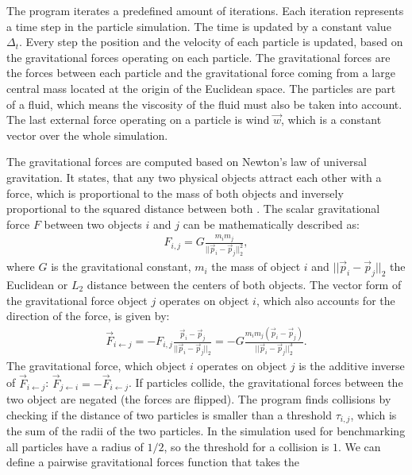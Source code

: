 \documentclass[twoside,11pt]{article}
\begin{document}
The program iterates a predefined amount of iterations.
Each iteration represents a time step in the particle simulation.
The time is updated by a constant value $\Delta_t$.
Every step the position and the velocity of each particle is
updated, based on the gravitational forces operating on each particle.
The gravitational forces are the forces between each particle and the
gravitational force coming from a large central mass located at the
origin of the Euclidean space.
The particles are part of a fluid, which means the viscosity of
the fluid must also be taken into account.
The last external force operating on a particle is wind $\vec{w}$,
which is a constant vector over the whole simulation.

The gravitational forces are computed based on Newton's law of
universal gravitation.
It states, that any two physical objects attract each other
with a force, which is proportional to the mass of both objects and
inversely proportional to the squared distance between both
\citep{feynman1963}.
The scalar gravitational force $F$ between two objects $i$ and $j$ can
be mathematically described as:
\begin{align}
  F_{i,j} = G\frac{m_i m_j}{||\vec{p}_i - \vec{p}_j||_2^2},
\end{align}
where $G$ is the gravitational constant, $m_i$ the mass of object $i$
and $||\vec{p}_i - \vec{p}_j||_2$ the Euclidean or $L_2$ distance
between the centers of both objects.
The vector form of the gravitational force object $j$ operates on
object $i$, which also accounts for the direction of the force,
is given by:
\begin{align}
  \label{eq:F}
  \vec{F}_{i\leftarrow j} = -F_{i,j}\frac{\vec{p}_i - \vec{p}_j}
                   {||\vec{p}_i - \vec{p}_j||_2}
          = -G\frac{m_i m_j (\vec{p}_i - \vec{p}_j)}
                   {||\vec{p}_i - \vec{p}_j||_2^3}.
\end{align}
The gravitational force, which object $i$ operates on object $j$ is
the additive inverse of $\vec{F}_{i \leftarrow j}$:
$\vec{F}_{j \leftarrow i} = -\vec{F}_{i \leftarrow j}$.
If particles collide, the gravitational forces between the two object
are negated (the forces are flipped).
The program finds collisions by checking if the distance of two
particles is smaller than a threshold $\tau_{i,j}$, which is the sum
of the radii of the two particles.
In the simulation used for benchmarking all particles have a radius of
$1/2$, so the threshold for a collision is $1$.
We can define a pairwise gravitational forces function that takes the
\end{document}
